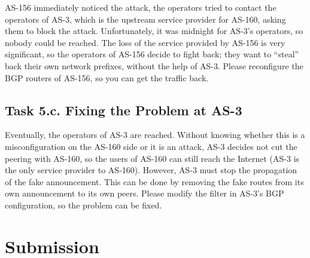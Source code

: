 AS-156 immediately noticed the attack, the operators tried to contact
the operators of AS-3, which is the upstream service provider for AS-160,
asking them to block the attack. Unfortunately, it was midnight for AS-3's
operators, so nobody could be reached. The loss of the service provided 
by AS-156 is very significant, so the operators of AS-156 decide to 
fight back; they want to ``steal'' back their own network prefixes, without the help
of AS-3. Please reconfigure the BGP routers of AS-156, so 
you can get the traffic back. 


\subsection{Task 5.c. Fixing the Problem at AS-3} 

Eventually, the operators of AS-3 are reached. Without knowing 
whether this is a misconfiguration on the AS-160 side or it is an 
attack, AS-3 decides not cut the peering with AS-160, so the users 
of AS-160 can still reach the Internet (AS-3 is the only service 
provider to AS-160). However, AS-3 must stop the propagation of the 
fake announcement. This can be done by removing the 
fake routes from its own announcement to its own peers. Please 
modify the filter in AS-3's BGP configuration, so the problem
can be fixed. 


\section{Submission}








